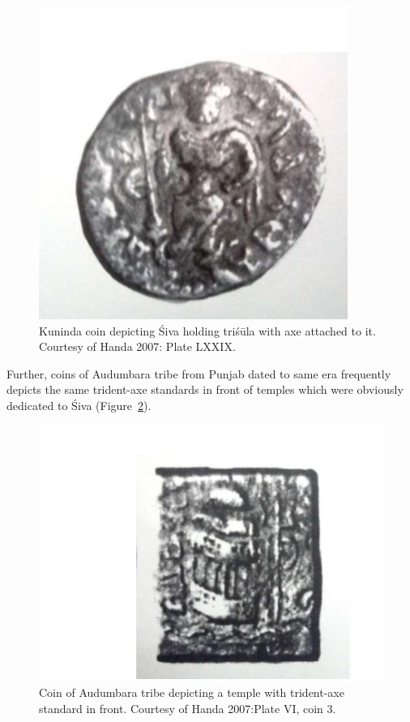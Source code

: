 \begin{figure}[!htbp]
\includegraphics{"images/article-05/art05-fig06.jpg"}
\caption{Kuninda coin depicting Śiva holding triśūla with axe attached to it. Courtesy of Handa 2007: Plate LXXIX.}\label{art5-fig6}
\end{figure}

Further, coins of Audumbara tribe from Punjab dated to same era frequently depicts the same trident-axe standards in front of temples which were obviously dedicated to Śiva (Figure~\ref{art5-fig7}).

\begin{figure}[!htbp]
\includegraphics{"images/article-05/art05-fig07.jpg"}
\caption{Coin of Audumbara tribe depicting a temple with trident-axe standard in front. Courtesy of Handa 2007:\break Plate VI, coin 3.}\label{art5-fig7}
\end{figure}

